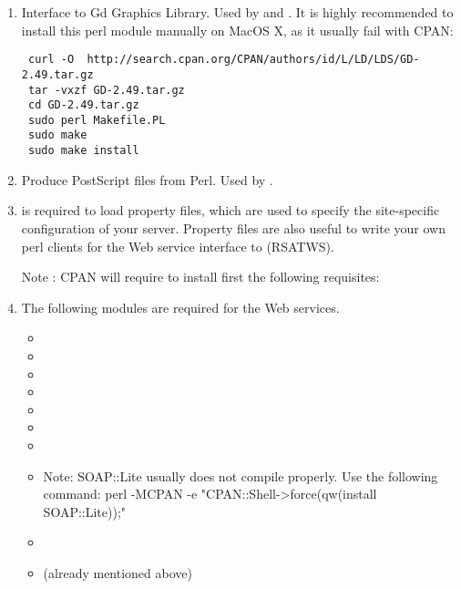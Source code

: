 \documentclass[12pt,a4paper, oneside]{scrreprt} %
\begin{document}
\begin{enumerate}
\item {} Interface to Gd Graphics Library. Used by
   and . It is highly recommended to install this perl module manually on MacOS X, as it usually fail with CPAN: 
  
  \begin{lstlisting}
 curl -O  http://search.cpan.org/CPAN/authors/id/L/LD/LDS/GD-2.49.tar.gz
 tar -vxzf GD-2.49.tar.gz
 cd GD-2.49.tar.gz
 sudo perl Makefile.PL
 sudo make
 sudo make install
\end{lstlisting}

\item {} Produce PostScript files from
  Perl. Used by .

\item {} is required to load property files,
  which are used to specify the site-specific configuration of your
  \RSAT server. Property files are also useful to write your own perl
  clients for the Web service interface to \RSAT (RSATWS).
  
  Note : CPAN will require to install first the following requisites:
  
  
  
  

\item 
  The following modules are required for the Web services. 

  \begin{itemize}
    \item {}
    \item {}
    \item {}
    \item {}
    \item {}
    \item {}
    \item {} 
    \item {}
    Note: SOAP::Lite usually does not compile properly. Use the following command:
    perl -MCPAN -e "CPAN::Shell->force(qw(install SOAP::Lite));"
    \item {}
    \item {} (already mentioned above) 
  \end{itemize}


\end{enumerate}
\end{document}

